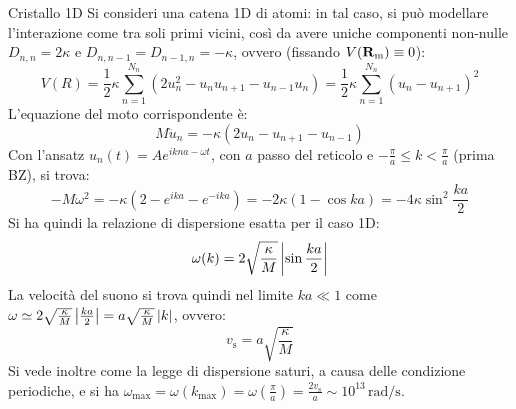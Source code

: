 \begin{example}{Cristallo 1D}{}
	Si consideri una catena 1D di atomi: in tal caso, si può modellare l'interazione come tra soli primi vicini, così da avere uniche componenti non-nulle $ D_{n,n} = 2\kappa $ e $ D_{n,n-1} = D_{n-1,n} = -\kappa $, ovvero (fissando $ V(\mathbf{R}_\text{m}) \equiv 0 $):
	\begin{equation*}
		V(R) = \frac{1}{2} \kappa \sum_{n = 1}^{N_n} \left( 2u_n^2 - u_n u_{n+1} - u_{n-1} u_n \right) = \frac{1}{2} \kappa \sum_{n = 1}^{N_n} \left( u_n - u_{n+1} \right)^2
	\end{equation*}
	L'equazione del moto corrispondente è:
	\begin{equation*}
		M \ddot{u}_n = - \kappa \left( 2u_n - u_{n+1} - u_{n-1} \right)
	\end{equation*}
	Con l'ansatz $ u_n(t) = A e^{i k n a - \omega t} $, con $ a $ passo del reticolo e $ - \frac{\pi}{a} \le k < \frac{\pi}{a} $ (prima BZ), si trova:
	\begin{equation*}
		- M \omega^2 = - \kappa \left( 2 - e^{i k a} - e^{-i k a} \right) = -2 \kappa \left( 1 - \cos ka \right) = -4 \kappa \sin^2 \frac{ka}{2}
	\end{equation*}
	Si ha quindi la relazione di dispersione esatta per il caso 1D:
	\begin{equation}
		\omega(k) = 2 \sqrt{\frac{\kappa}{M}} \left\lvert\sin \frac{ka}{2}\right\rvert
	\end{equation}
	La velocità del suono si trova quindi nel limite $ ka \ll 1 $ come $ \omega \simeq 2 \sqrt{\frac{\kappa}{M}} \left\lvert\frac{ka}{2}\right\rvert = a \sqrt{\frac{\kappa}{M}} \left\lvert k\right\rvert $, ovvero:
	\begin{equation}
		v_\text{s} = a \sqrt{\frac{\kappa}{M}}
	\end{equation}
	Si vede inoltre come la legge di dispersione saturi, a causa delle condizione periodiche, e si ha $ \omega_\text{max} = \omega(k_\text{max}) = \omega(\frac{\pi}{a}) = \frac{2 v_\text{s}}{a} \sim 10^{13} \,\text{rad}/\text{s} $.
\end{example}

